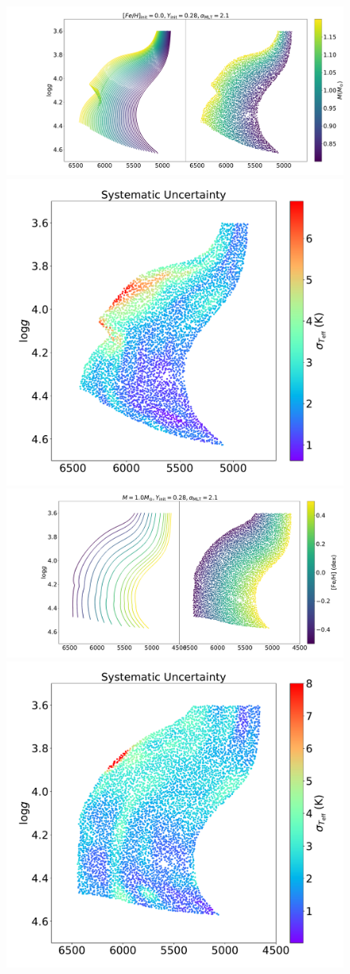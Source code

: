 \begin{figure}
	\includegraphics[width=1.2\columnwidth]{5d-au-mass.pdf}
	\includegraphics[width=0.65\columnwidth]{5d-au-mass-sys.pdf}
	\includegraphics[width=1.2\columnwidth]{5d-au-feh.pdf}
	\includegraphics[width=0.65\columnwidth]{5d-au-feh-sys.pdf}

\end{figure}
